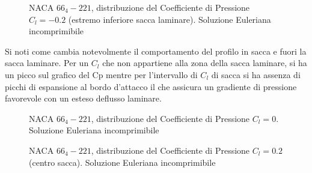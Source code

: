 \begin{figure} [h!]
\centering
{}
\caption{\footnotesize NACA $66_4-221$, distribuzione del Coefficiente di Pressione $C_l=-0.2$ (estremo inferiore sacca laminare). Soluzione Euleriana incomprimibile }
\end{figure}

Si noti come cambia notevolmente il comportamento del profilo in sacca e fuori la sacca laminare. Per un $C_l$ che non appartiene alla zona della sacca laminare, si ha un picco sul grafico del Cp mentre per l'intervallo di $C_l$ di sacca si ha assenza di picchi di espansione al bordo d'attacco il che assicura un gradiente di pressione favorevole con un esteso deflusso laminare.

\begin{figure} [H]
\centering
{}
\caption{\footnotesize NACA $66_4-221$, distribuzione del Coefficiente di Pressione $C_l=0$. Soluzione Euleriana incomprimibile }
\end{figure}


\begin{figure} [h!]
\centering
{}
\caption{\footnotesize NACA $66_4-221$, distribuzione del Coefficiente di Pressione $C_l=0.2$ (centro sacca). Soluzione Euleriana incomprimibile }
\end{figure}




